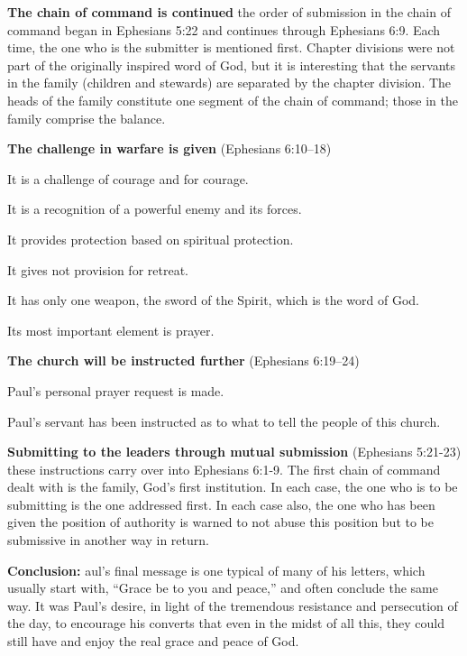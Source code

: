 \begin{compactenum}[I.]
    \item \textbf{The chain of command is continued} the order of submission in the chain of command began in  Ephesians 5:22 and continues through  Ephesians 6:9. Each time, the one who is the submitter is mentioned first. Chapter divisions were not part of the originally inspired word of God, but it is interesting that the servants in the family (children and stewards) are separated by the chapter division. The heads of the family constitute one segment of the chain of command; those in the family comprise the balance.
    \item \textbf{The challenge in warfare is given}  (Ephesians 6:10--18) 
    \begin{compactenum}[A.]
    	\item It is a challenge of courage and for courage.
    	\item It is a recognition of a powerful enemy and its forces.
    	\item It provides protection based on spiritual protection.
    	\item It gives not provision for retreat.
    	\item It has only one weapon, the sword of the Spirit, which is the word of God.
    	\item Its most important element is prayer.
    \end{compactenum}
    \item \textbf{The church will be instructed further}  (Ephesians 6:19--24) 
    \begin{compactenum}[A.]
    	\item Paul’s personal prayer request is made.
    	\item Paul’s servant has been instructed as to what to tell the people of this church.
    \end{compactenum}
    \item \textbf{Submitting to the leaders through mutual submission}  (Ephesians 5:21-23) these instructions carry over into  Ephesians 6:1-9. The first chain of command dealt with is the family, God’s first institution. In each case, the one who is to be submitting is the one addressed first. In each case also, the one who has been given the position of authority is warned to not abuse this position but to be submissive in another way in return.
\end{compactenum}
\textbf{Conclusion:} aul’s final message is one typical of many of his letters, which usually start with, “Grace be to you and peace,” and often conclude the same way. It was Paul’s desire, in light of the tremendous resistance and persecution of the day, to encourage his converts that even in the midst of all this, they could still have and enjoy the real grace and peace of God.

